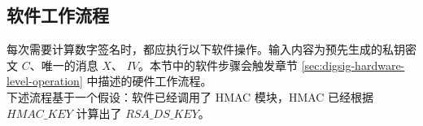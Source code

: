 \documentclass[main\_\_CN.tex]{subfiles}
\begin{document}
\subsection{软件工作流程}

每次需要计算数字签名时，都应执行以下软件操作。输入内容为预先生成的私钥密文 \begin{math}C\end{math}、唯一的消息 \begin{math}X\end{math}、 \begin{math}IV\end{math}。本节中的软件步骤会触发章节 \ref{sec:digsig-hardware-level-operation} 中描述的硬件工作流程。\\
下述流程基于一个假设：软件已经调用了 HMAC 模块，HMAC 已经根据 \begin{math}HMAC\_KEY\end{math} 计算出了 \begin{math}RSA\_DS\_KEY\end{math}。
\end{document}
